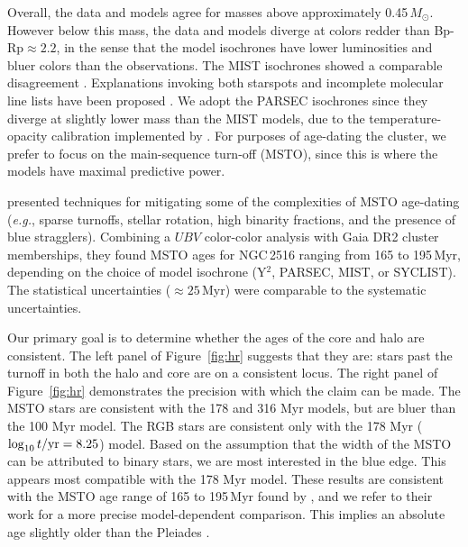 \documentclass[12pt,twocolumn,tighten]{aastex63}
\begin{document}
Overall, the data and models agree for masses above approximately
0.45\,$M_\odot$.  However below this mass, the data and models diverge
at colors redder than Bp-Rp$\approx2.2$, in the sense that the model
isochrones have lower luminosities and bluer colors than the
observations.  The MIST isochrones showed a comparable disagreement
\citep{choi_mesa_2016}.  Explanations invoking both starspots and
incomplete molecular line lists have been proposed \citep[{\it
e.g.},][]{stauffer_why_2003,feiden_magnetic_2013,rajpurohit_effective_2013,mann_spectrothermometry_2013,choi_mesa_2016}.
We adopt the PARSEC isochrones since they diverge at slightly lower
mass than the MIST models, due to the temperature-opacity calibration
implemented by \citet{chen_improving_2014}.  For purposes of
age-dating the cluster, we prefer to focus on the main-sequence
turn-off (MSTO), since this is where the models have maximal predictive
power.

\citet{cummings_2018} presented techniques for mitigating some of the
complexities of MSTO age-dating ({\it e.g.}, sparse turnoffs, stellar
rotation, high binarity fractions, and the presence of blue
stragglers).  Combining a $UBV$ color-color analysis with Gaia DR2
cluster memberships, they found MSTO ages for NGC\,2516 ranging from
165 to 195\,Myr, depending on the choice of model isochrone (Y$^2$,
PARSEC, MIST, or SYCLIST).  The statistical uncertainties ($\approx
25$\,Myr) were comparable to the systematic uncertainties.

Our primary goal is to determine whether the ages of the core and halo
are consistent.  The left panel of Figure~\ref{fig:hr} suggests that
they are: stars past the turnoff in both the halo and core are on a
consistent locus.  The right panel of Figure~\ref{fig:hr} demonstrates
the precision with which the claim can be made.  The MSTO stars are
consistent with the 178 and 316 Myr models, but are bluer than the 100
Myr model.  The RGB stars are consistent only with the 178 Myr
($\log_{10} t/{\rm yr} = 8.25$) model.  Based on the assumption that
the width of the MSTO can be attributed to binary stars, we are most
interested in the blue edge. This appears most compatible with the 178
Myr model.  These results are consistent with the MSTO age range of
165 to 195\,Myr found by \citet{cummings_2018}, and we refer to their
work for a more precise model-dependent comparison.
This implies an absolute age slightly older than the Pleiades
\citep[{\it cf.}][]{mermilliod_comparative_1981}.

\end{document}

